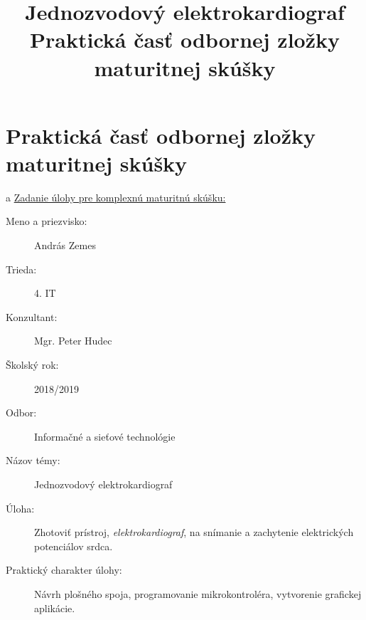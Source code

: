 \documentclass[titlepage,12pt]{article}
\title{\textbf{Jednozvodový elektrokardiograf} \\
\large Praktická časť odbornej zložky maturitnej skúšky}
\date{\empty}
\begin{document}
\bgroup
	 {
		\fancyfoot[C] {\empty}		
	}
	\maketitle
\egroup

\restoregeometry

\setcounter{page}{2}
\section*{Praktická časť odbornej zložky maturitnej skúšky}
a \underline{Zadanie úlohy pre komplexnú maturitnú skúšku:} 
\newline

\begin{description}
	\item [Meno a priezvisko:]
		\tabto{5cm} András Zemes
		
    \item [Trieda:]	
    	\tabto{5cm} 4. IT
    	
	\item [Konzultant:]		 	  
		\tabto{5cm} Mgr. Peter Hudec
		
	\item [Školský rok:] 
		\tabto{5cm} 2018/2019
		
	\item [Odbor:]		  
		\tabto{5cm} Informačné a sieťové technológie
		
	\item [Názov témy:]			  
		\tabto{5cm} Jednozvodový elektrokardiograf 
		
	\item [Úloha:]				  
		\tabto{5cm} Zhotoviť prístroj, \emph{elektrokardiograf}, na snímanie 
		\tabto{5cm} a zachytenie elektrických potenciálov srdca.
	
	\item [Praktický charakter úlohy:]
		\tabto{5cm} Návrh plošného spoja, programovanie 
		\tabto{5cm} mikrokontroléra, vytvorenie grafickej aplikácie.
		
\end{description}
	
\end{document}

